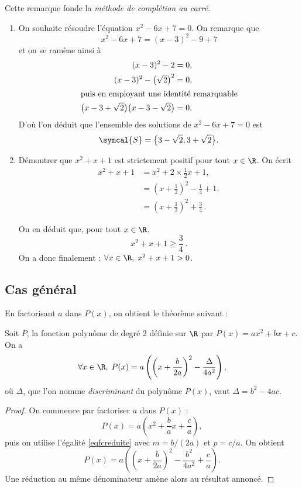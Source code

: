 Cette remarque fonde la \emph{méthode de complétion au carré}.

\begin{example}[Exemples]
\begin{enumerate}
\item  \label{explefactor} 
On souhaite résoudre l'équation $x^2-6x+7=0$. On remarque que \[x^2-6x+7=(x-3)^2-9+7\] et on se ramène ainsi à
\begin{align*}
(x-3)^2-2&=0,\\
(x-3)^2-\bigl(\sqrt{2}\bigr)^2&=0,\\
\intertext{puis en employant une identité remarquable}
\bigl(x-3+\sqrt{2}\bigr)\bigl(x-3-\sqrt{2}\bigr)&=0.
\end{align*}
D'où l'on déduit que l'ensemble des solutions de $x^2-6x+7=0$ est 
\[
\symcal{S}=\bigl\{3-\sqrt{2}, 3+\sqrt{2}\bigr\}.
\]
\item Démontrer que $x^2+x+1$ est strictement positif pour tout $x\in\R$.
On écrit 
\begin{align*}
x^2+x+1&=x^2+2\times\frac12x+1,\\
&=\left(x+\frac12\right)^2-\frac14+1,\\
&=\left(x+\frac12\right)^2+\frac34\,.
\end{align*}

On en déduit que, pour tout $x\in\R$,
\[x^2+x+1≥\frac34\:.\]
On a donc finalement : $\forall x\in\R,\; x^2+x+1>0$.
\end{enumerate}
\end{example}
\subsection{Cas général}
En factorisant $a$ dans  $P(x)$, on obtient le théorème suivant :
\begin{thm}
Soit $P$, la fonction polynôme de degré 2 définie sur $\R$ par $P(x)=ax^2+bx+c$. On a 
\begin{equation}
\forall x\in\R,\;P(x)=a\left(\left(x+\frac{b}{2a}\right)^2-\frac{\Delta}{4a^2}\vphantom{\frac{b^2}{4a^2}}\right),\label{eqformcan}
\end{equation}
où $\Delta$, que l'on nomme \emph{discriminant} du polynôme $P(x)$, vaut $\Delta=b^2-4ac$.
\label{thformcan}
\end{thm}
\begin{proof}
On commence par factoriser $a$ dans $P(x)$ :
\[P(x)=a\left(x^2+\frac{b}{a}x+\frac{c}{a}\right),\]
puis on utilise l'égalité \eqref{eqfcreduite} avec $m=b/(2a)$ et $p=c/a$. On obtient 
\[P(x)=a\left(\left(x+\frac{b}{2a}\right)^2-\frac{b^2}{4a^2}+\frac{c}{a}\right).
\]
Une réduction au même dénominateur amène alors au résultat annoncé.
\end{proof}

